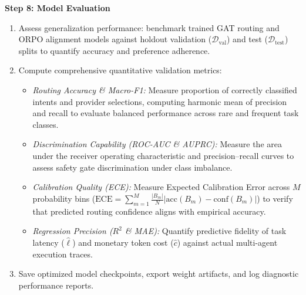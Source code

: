 \documentclass[11pt,a4paper]{article}
\begin{document}
\newpage


\textbf{Step 8: Model Evaluation}
\begin{enumerate}[leftmargin=1.8em, itemsep=0.22em, topsep=0.06em]
    \item Assess generalization performance: benchmark trained GAT routing and ORPO alignment models against holdout validation ($\mathcal{D}_{\text{val}}$) and test ($\mathcal{D}_{\text{test}}$) splits to quantify accuracy and preference adherence.
    \item Compute comprehensive quantitative validation metrics:
    \begin{itemize}[leftmargin=1.5em, itemsep=0.08em, topsep=0.04em, label=$\ast$]
        \item \textit{Routing Accuracy \& Macro-F1:} Measure proportion of correctly classified intents and provider selections, computing harmonic mean of precision and recall to evaluate balanced performance across rare and frequent task classes.
        \item \textit{Discrimination Capability (ROC-AUC \& AUPRC):} Measure the area under the receiver operating characteristic and precision--recall curves to assess safety gate discrimination under class imbalance.
        \item \textit{Calibration Quality (ECE):} Measure Expected Calibration Error across $M$ probability bins ($\mathrm{ECE} = \sum_{m=1}^M \frac{|B_m|}{N} |\mathrm{acc}(B_m) - \mathrm{conf}(B_m)|$) to verify that predicted routing confidence aligns with empirical accuracy.
        \item \textit{Regression Precision ($R^2$ \& MAE):} Quantify predictive fidelity of task latency ($\hat{\ell}$) and monetary token cost ($\hat{c}$) against actual multi-agent execution traces.
    \end{itemize}
    \item Save optimized model checkpoints, export weight artifacts, and log diagnostic performance reports.
\end{enumerate}
\end{document}
